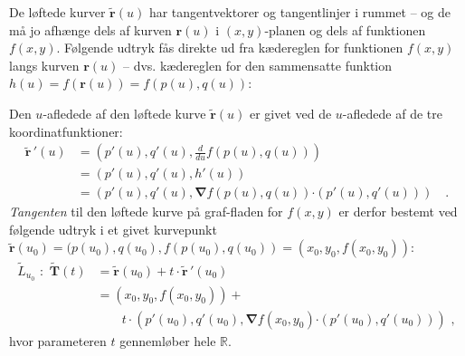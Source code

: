 De løftede kurver $\widetilde{\mathbf{r}}(u)$ har tangentvektorer og tangentlinjer i rummet --  og de må jo afhænge dels af kurven  ${\mathbf{r}}(u)$ i $(x,y)$-planen og dels af funktionen $f(x,y)$. Følgende udtryk fås direkte ud fra kædereglen for funktionen $f(x,y)$ langs kurven $\mathbf{r}(u)$ -- dvs. kædereglen for den sammensatte funktion $h(u) = f(\mathbf{r}(u)) = f(p(u), q(u))$:

\begin{theorem}
Den $u$-afledede af den løftede kurve $\widetilde{\mathbf{r}}(u)$ er givet ved de $u$-afledede af de tre koordinatfunktioner:
\begin{equation}
\begin{aligned}
\widetilde{\mathbf{r}}\,'(u) &=  \left(p'(u), q'(u), \frac{d}{du}f(p(u), q(u)) \right) \\
&=  \left(p'(u), q'(u), h'(u) \right) \\
&= \left(p'(u), q'(u), {\bm{\nabla}}f(p(u), q(u))\bm{\cdot} (p'(u), q'(u)) \right) \quad.
\end{aligned}
\end{equation}
\emph{Tangenten} til den løftede kurve på graf-fladen for $f(x,y)$ er derfor bestemt ved følgende udtryk i et givet kurvepunkt $\widetilde{\mathbf{r}}(u_{0}) = (p(u_{0}), q(u_{0}), f(p(u_{0}), q(u_{0})) = (x_{0}, y_{0}, f(x_{0}, y_{0}))$:
\begin{equation} \label{eqTangLift}
\begin{aligned}
\widetilde{L}_{u_{0}} \, \,  : \, \,  \widetilde{\mathbf{T}}(t) &=\widetilde{\mathbf{r}}(u_{0}) + t\cdot \widetilde{\mathbf{r}}\,'(u_{0}) \\
&= (x_{0}, y_{0}, f(x_{0}, y_{0})) + \\
& \qquad t\cdot \left(p'(u_{0}), q'(u_{0}), {\bm{\nabla}}f(x_{0}, y_{0})\bm{\cdot} (p'(u_{0}), q'(u_{0})) \right) \, \, ,
\end{aligned}
\end{equation}
hvor parameteren $t$ gennemløber hele $\mathbb{R}$.
\end{theorem}



